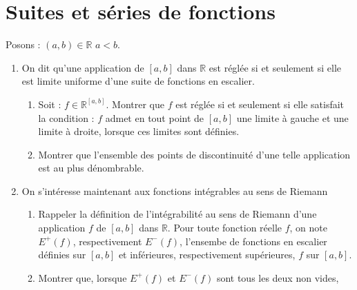 \section{Suites et séries de fonctions}

\begin{exer}
Posons : $(a,b) \in \mathbb{R}$ $a < b$.
\begin{enumerate}
\item On dit qu'une application de $[a,b]$ dans $\mathbb{R}$ est réglée si et seulement si %
elle est limite uniforme d'une suite de fonctions en escalier.
\begin{enumerate}
\item Soit : $f \in \mathbb{R}^{[a,b]}$. Montrer que $f$ est réglée si et seulement si elle satisfait la condition : %
$f$ admet en tout point de $[a,b]$ une limite à gauche et une limite à droite, lorsque ces limites sont définies.
\item Montrer que l'ensemble des points de discontinuité d'une telle application est au plus dénombrable.
\end{enumerate}
\item On s'int\'eresse maintenant aux fonctions int\'egrables au sens de Riemann
\begin{enumerate}
\item Rappeler la définition de l'intégrabilité au sens de Riemann d'une application $f$ de $[a,b]$ dans $\mathbb{R}$.
Pour toute fonction r\'eelle $f$, on note $E^+(f)$, respectivement $E^-(f)$, l'ensembe de fonctions en escalier d\'efinies sur $[a,b]$ et inf\'erieures, respectivement sup\'erieures,  $f$ sur $[a,b]$.
\item Montrer que, lorsque $E^+(f)$ et $E^-(f)$ sont tous les deux non vides, %

\end{enumerate}
\end{enumerate}
\end{exer}
